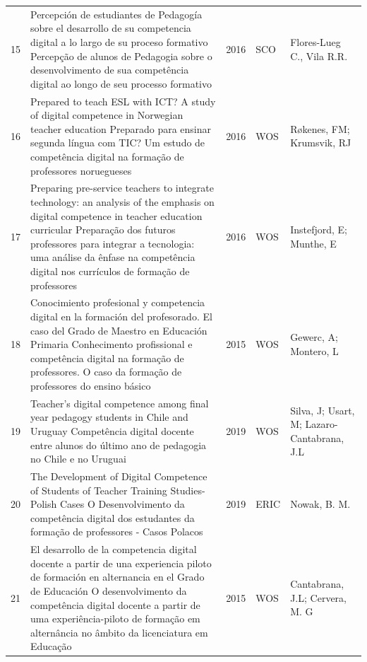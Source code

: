 \documentclass[portuguese]{textolivre}
\begin{document}
\begin{small}
\begin{longtable}{
    @{}l >{\raggedright\arraybackslash}p{}
    @{}ll
    >{\raggedright\arraybackslash}p{}@{}
    }
15 & Percepción de estudiantes de Pedagogía sobre el desarrollo de su competencia digital a lo largo de su proceso formativo \newline
Percepção de alunos de Pedagogia sobre o desenvolvimento de sua competência digital ao longo de seu processo formativo & 2016 & SCO	& Flores-Lueg C., Vila R.R.\\
16 & Prepared to teach ESL with ICT? A study of digital competence in Norwegian teacher education \newline
Preparado para ensinar segunda língua com TIC? Um estudo de competência digital na formação de professores noruegueses & 2016 & WOS & Røkenes, FM; Krumsvik, RJ \\
17 & Preparing pre-service teachers to integrate technology: an analysis of the emphasis on digital competence in teacher education curricular \newline
Preparação dos futuros professores para integrar a tecnologia: uma análise da ênfase na competência digital nos currículos de formação de professores & 2016 & WOS & Instefjord, E; Munthe, E \\
18 & Conocimiento profesional y competencia digital en la formación del profesorado. El caso del Grado de Maestro en Educación Primaria \newline
Conhecimento profissional e competência digital na formação de professores. O caso da formação de professores do ensino básico & 2015 & WOS & Gewerc, A; Montero, L \\
19 & Teacher's digital competence among final year pedagogy students in Chile and Uruguay \newline 
Competência digital docente entre alunos do último ano de pedagogia no Chile e no Uruguai	& 2019 & WOS & Silva, J; Usart, M; Lazaro-Cantabrana, J.L \\
20 & The Development of Digital Competence of Students of Teacher Training Studies-Polish Cases \newline
O Desenvolvimento da competência digital dos estudantes da formação de professores - Casos Polacos & 2019 & ERIC & Nowak, B. M. \\
21 & El desarrollo de la competencia digital docente a partir de una experiencia piloto de formación en alternancia en el Grado de Educación \newline
O desenvolvimento da competência digital docente a partir de uma experiência-piloto de formação em alternância no âmbito da licenciatura em Educação & 2015 & WOS & Cantabrana, J.L; Cervera, M. G \\

\end{longtable}
\end{small}
\end{document}
